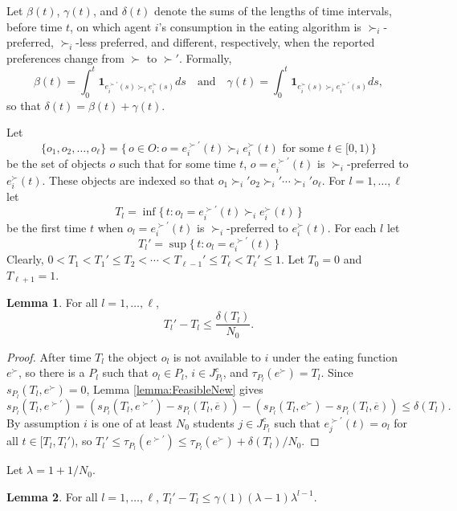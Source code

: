 \documentclass[12pt, A4paper]{article}
\theoremstyle{definition}
\newtheorem{lem}{Lemma}
\newcommand{\bare}{\overline{e}}
\newcommand{\bone}{\mathbf{1}}
\begin{document}
\begin{appendix}
Let $\beta(t)$, $\gamma(t)$, and $\delta(t)$ denote the sums of the lengths of time intervals, before time $t$, on which agent $i$'s consumption in the eating algorithm is $\succ_i$-preferred, $\succ_i$-less preferred, and different, respectively, when the reported preferences change from $\succ$ to $\succ'$.  Formally,
$$\beta(t) = \int_0^t \bone_{e_i^{\succ'}(s) \succ_i e_i^\succ(s)} ds \quad \text{and} \quad \gamma(t) = \int_0^t \bone_{e_i^{\succ}(s) \succ_i e_i^{\succ'}(s)} ds,$$ so that $\delta(t) = \beta(t) + \gamma(t)$.

Let
$$\{o_1, o_2, \ldots, o_{\ell}\} = \{\, o \in O : \text{$o = e_i^{\succ'}(t) \succ_i e_i^\succ(t)$ for some $t \in [0,1)$} \,\}$$
be the set of objects $o$ such that for some time $t$, $o = e_i^{\succ'}(t)$ is $\succ_i$-preferred to $e_i^\succ(t)$.  
These objects are indexed so that 
$o_1 \succ_i' o_2 \succ_i' \cdots \succ_i' o_{\ell}$.  For $l = 1, \ldots, \ell$ let
$$T_l = \inf \{\, t : o_l = e_i^{\succ'}(t) \succ_i e_i^\succ(t) \,\}$$ 
be the first time $t$ when $o_l = e_i^{\succ'}(t)$ is $\succ_i$-preferred to $e_i^\succ(t)$.  For each $l$ let 
$$T_l' = \sup \{\, t : o_l = e_i^{\succ'}(t) \,\}$$ 
Clearly, $0 < T_1 < T_1' \le T_2 < \cdots < T_{\ell - 1}' \le T_{\ell} < T_{\ell}' \le1$.  Let $T_0= 0$ and $T_{\ell + 1} = 1$.



\begin{lem} \label{lemma:KM5New}
  For all $l = 1, \ldots, \ell$, 
  $$T_l' - T_l \le \frac{\delta(T_l)}{N_0}.$$
\end{lem}

\begin{proof}
  After time $T_l$ the object $o_l$ is not available to $i$ under the eating function $e^\succ$, so there is a $P_l$ such that $o_l \in P_l$, $i \in J_{P_l}^c$, and $\tau_{P_l}(e^\succ) = T_l$. Since $s_{P_l}(T_l,e^{\succ}) = 0$, Lemma \ref{lemma:FeasibleNew} gives
  $$s_{P_l}(T_l,e^{\succ'}) = (s_{P_l}(T_l,e^{\succ'}) - s_{P_l}(T_l,\bare)) - (s_{P_l}(T_l,e^{\succ}) - s_{P_l}(T_l,\bare)) \le \delta(T_l).$$
  By assumption $i$ is one of at least $N_0$ students $j \in J_{P_l}^c$ such that $e^{\succ'}_j(t) = o_l$ for all $t \in [T_l, T_l')$, so $T_l' \le \tau_{P_l}(e^{\succ'}) \le \tau_{P_l}(e^\succ) + \delta(T_l)/N_0$.  
\end{proof}

Let $\lambda = 1 + 1/N_0$.

\begin{lem} \label{lemma:KM6}
  For all $l = 1, \ldots, \ell$,
  $T_l' - T_l \le \gamma(1)(\lambda - 1)\lambda^{l-1}$.
\end{lem}


\end{appendix}
\end{document}
